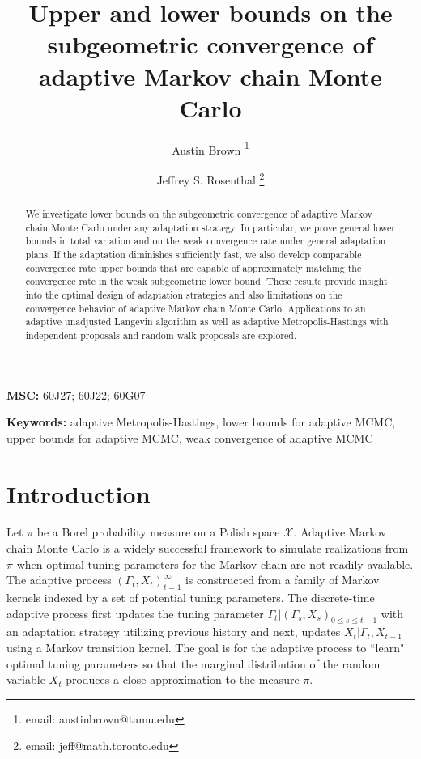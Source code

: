 \documentclass[12pt]{article}
\theoremstyle{plain}
\theoremstyle{remark}
\newcommand{\X}{\mathcal{X}}
\begin{document}
\title{Upper and lower bounds on the subgeometric convergence of adaptive Markov chain Monte Carlo}

\author[1]{Austin Brown \thanks{email: austinbrown@tamu.edu}}
\author[2]{Jeffrey S. Rosenthal \thanks{email: jeff@math.toronto.edu}}

\maketitle

\begin{abstract}
We investigate lower bounds on the subgeometric convergence of adaptive Markov chain Monte Carlo under any adaptation strategy. In particular, we prove general lower bounds in total variation and on the weak convergence rate under general adaptation plans. 
If the adaptation diminishes sufficiently fast, we also develop comparable convergence rate upper bounds that are capable of approximately matching the convergence rate in the weak subgeometric lower bound.
These results provide insight into the optimal design of adaptation strategies and also limitations on the convergence behavior of adaptive Markov chain Monte Carlo. 
Applications to an adaptive unadjusted Langevin algorithm as well as adaptive Metropolis-Hastings with independent proposals and random-walk proposals are explored. 
\end{abstract}

\textbf{MSC:} 
60J27; 60J22; 60G07

\textbf{Keywords:} 
adaptive Metropolis-Hastings, 
lower bounds for adaptive MCMC,
upper bounds for adaptive MCMC,
weak convergence of adaptive MCMC

\section{Introduction}

Let $\pi$ be a Borel probability measure on a Polish space $\X$.
Adaptive Markov chain Monte Carlo \citep{haario:2001, roberts:rosenthal:2007} is a widely successful framework to simulate realizations from $\pi$ when optimal tuning parameters for the Markov chain are not readily available.
The adaptive process $(\Gamma_t, X_t)_{t = 1}^\infty$ is constructed from a family of Markov kernels indexed by a set of potential tuning parameters.
The discrete-time adaptive process first updates the tuning parameter $\Gamma_t | ( \Gamma_s, X_s )_{0 \le s \le t-1}$ with an adaptation strategy utilizing previous history and next, updates $X_t | \Gamma_{t}, X_{t - 1}$ using a Markov transition kernel.
The goal is for the adaptive process to ``learn" optimal tuning parameters so that the marginal distribution of the random variable $X_t$ produces a close approximation to the measure $\pi$.
\end{document}

